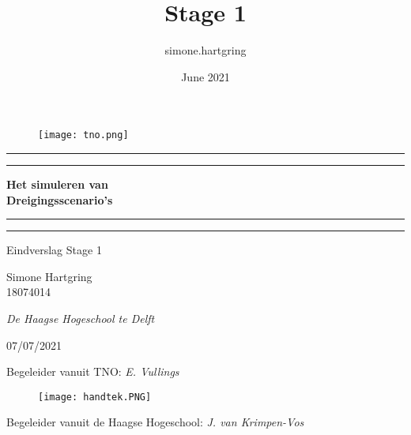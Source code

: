 \documentclass[12pt, letterpaper]{article}
\title{Stage 1}
\author{simone.hartgring }
\date{June 2021}
\begin{document}
\begin{titlepage}

    \centering %
	\begin{figure}[t]
	    \begin{flushright}
            \texttt{[image: tno.png]}
        \end{flushright}
    \end{figure}
    
	
	\vspace*{\baselineskip} %
	
	\rule{\textwidth}{1.6pt}\vspace*{-\baselineskip}\vspace*{2pt} %
	\rule{\textwidth}{0.4pt} %
	
	\vspace{0.75\baselineskip} %
	
	\LARGE\bfseries Het simuleren van \\  Dreigingsscenario's %
	
	\vspace{0.25\baselineskip} %
	
	\rule{\textwidth}{0.4pt}\vspace*{-\baselineskip}\vspace{3.2pt} %
	\rule{\textwidth}{1.6pt} %
	
	\vspace{1\baselineskip} %
	\large Eindverslag Stage 1
	
	\vspace*{2\baselineskip} %

	
	\Large Simone Hartgring
	\\
	\small 18074014
	
	\vspace*{\baselineskip}
	
	\normalsize \emph{De Haagse Hogeschool te Delft}
	
	\vspace*{\baselineskip}
	
	\small 07/07/2021
	
	\vspace*{8\baselineskip} %
	
	\begin{flushleft}
	    Begeleider vanuit TNO: \emph{E. Vullings}
\begin{figure}[H]
\texttt{[image: handtek.PNG]}
\end{figure}
	    	
	    Begeleider vanuit de Haagse Hogeschool: \emph{J. van Krimpen-Vos}
	\end{flushleft}
	
\end{titlepage}
\sffamily
\newpage
\end{document}
